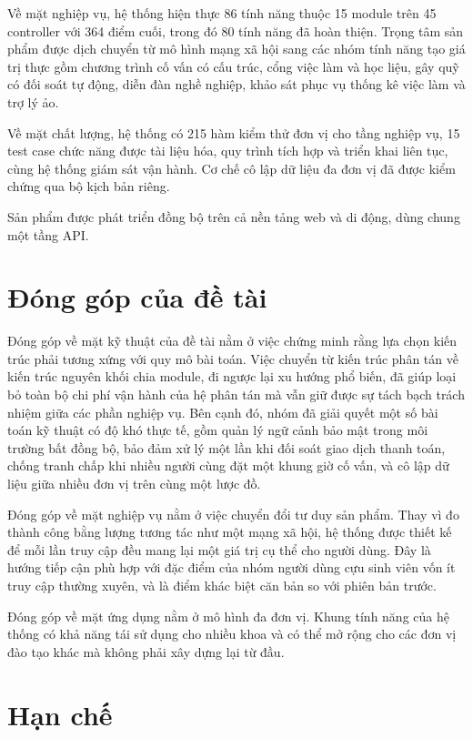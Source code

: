 \documentclass[12pt,a4paper,oneside]{report}
\begin{document}
Về mặt nghiệp vụ, hệ thống hiện thực 86 tính năng thuộc 15 module trên 45 controller với 364 điểm cuối, trong đó 80 tính năng đã hoàn thiện. Trọng tâm sản phẩm được dịch chuyển từ mô hình mạng xã hội sang các nhóm tính năng tạo giá trị thực gồm chương trình cố vấn có cấu trúc, cổng việc làm và học liệu, gây quỹ có đối soát tự động, diễn đàn nghề nghiệp, khảo sát phục vụ thống kê việc làm và trợ lý ảo.

Về mặt chất lượng, hệ thống có 215 hàm kiểm thử đơn vị cho tầng nghiệp vụ, 15 test case chức năng được tài liệu hóa, quy trình tích hợp và triển khai liên tục, cùng hệ thống giám sát vận hành. Cơ chế cô lập dữ liệu đa đơn vị đã được kiểm chứng qua bộ kịch bản riêng.

Sản phẩm được phát triển đồng bộ trên cả nền tảng web và di động, dùng chung một tầng API.

\section{Đóng góp của đề tài}

Đóng góp về mặt kỹ thuật của đề tài nằm ở việc chứng minh rằng lựa chọn kiến trúc phải tương xứng với quy mô bài toán. Việc chuyển từ kiến trúc phân tán về kiến trúc nguyên khối chia module, đi ngược lại xu hướng phổ biến, đã giúp loại bỏ toàn bộ chi phí vận hành của hệ phân tán mà vẫn giữ được sự tách bạch trách nhiệm giữa các phần nghiệp vụ. Bên cạnh đó, nhóm đã giải quyết một số bài toán kỹ thuật có độ khó thực tế, gồm quản lý ngữ cảnh bảo mật trong môi trường bất đồng bộ, bảo đảm xử lý một lần khi đối soát giao dịch thanh toán, chống tranh chấp khi nhiều người cùng đặt một khung giờ cố vấn, và cô lập dữ liệu giữa nhiều đơn vị trên cùng một lược đồ.

Đóng góp về mặt nghiệp vụ nằm ở việc chuyển đổi tư duy sản phẩm. Thay vì đo thành công bằng lượng tương tác như một mạng xã hội, hệ thống được thiết kế để mỗi lần truy cập đều mang lại một giá trị cụ thể cho người dùng. Đây là hướng tiếp cận phù hợp với đặc điểm của nhóm người dùng cựu sinh viên vốn ít truy cập thường xuyên, và là điểm khác biệt căn bản so với phiên bản trước.

Đóng góp về mặt ứng dụng nằm ở mô hình đa đơn vị. Khung tính năng của hệ thống có khả năng tái sử dụng cho nhiều khoa và có thể mở rộng cho các đơn vị đào tạo khác mà không phải xây dựng lại từ đầu.

\section{Hạn chế}
\end{document}
